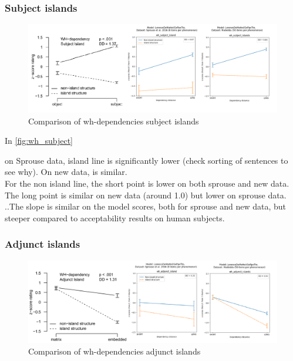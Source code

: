 

\subsubsection{Subject islands}

\begin{figure}
	\centering
	\includegraphics[width=1\textwidth]{images/Chapter1/combined_wh-subject.png} 
	\caption{Comparison of wh-dependencies subject islands} 
	\label{fig:wh_subject} %
\end{figure}

In \autoref{fig:wh_subject}

on Sprouse data, island line is significantly lower (check sorting of sentences to see why). On new data, is similar. \\
For the non island line, the short point is lower on both sprouse and new data. \\ 
The long point is similar on new data (around 1.0) but lower on sprouse data. \\
..The slope is similar on the model scores, both for sprouse and new data, but steeper compared to acceptability results on human subjects.


\subsubsection{Adjunct islands}

\begin{figure}
	\centering
	\includegraphics[width=1\textwidth]{images/Chapter1/combined_wh-adjunct.png} 
	\caption{Comparison of wh-dependencies adjunct islands} 
	\label{fig:wh_adjunct} %
\end{figure}



